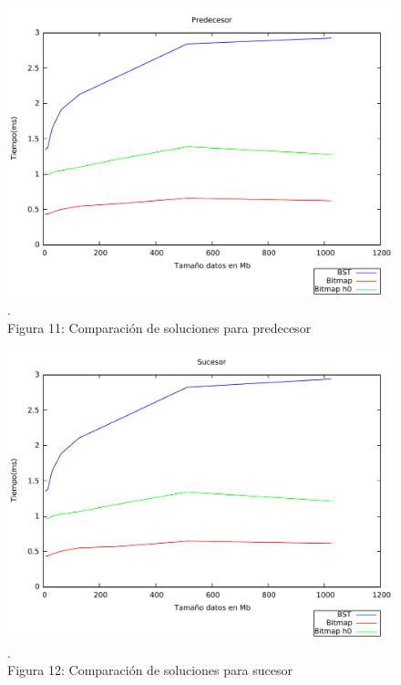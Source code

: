 \documentclass[11pt]{article}
\begin{document}
\begin{center}\begin{figure}[htp]
\centering
\includegraphics[scale=0.45]{exppred.pdf}
\\\scriptsize{\color{white}.\color{black}\\Figura 11: Comparación de soluciones para predecesor}
\label{etiqueta}
\end{figure}
\end{center}
\begin{center}\begin{figure}[htp]
\centering
\includegraphics[scale=0.45]{expsuc.pdf}
\\\scriptsize{\color{white}.\color{black}\\Figura 12: Comparación de soluciones para sucesor}
\label{etiqueta}
\end{figure}
\end{center}
\clearpage
\end{document}

